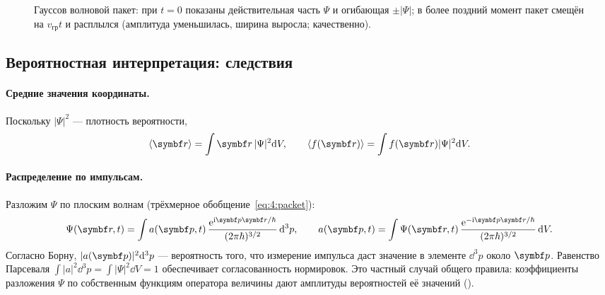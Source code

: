 \begin{figure}[htbp]
\centering
{}
\caption{Гауссов волновой пакет: при $t=0$ показаны действительная часть $\Psi$ и огибающая
$\pm|\Psi|$; в более поздний момент пакет смещён на $v_{\text{гр}}t$ и расплылся
(амплитуда уменьшилась, ширина выросла; качественно).}
\label{fig:4:packet}
\end{figure}

\subsection{Вероятностная интерпретация: следствия}

\paragraph{Средние значения координаты.} Поскольку $|\Psi|^2$ — плотность вероятности,
\begin{equation}
  \avg{\vect r}=\int\vect r\,|\Psi|^2\dd V,\qquad \avg{f(\vect r)}=\int f(\vect r)|\Psi|^2\dd V .
\end{equation}

\paragraph{Распределение по импульсам.} Разложим $\Psi$ по плоским волнам (трёхмерное
обобщение~\eqref{eq:4:packet}):
\begin{equation}\label{eq:4:ap}
  \Psi(\vect r,t)=\int a(\vect p,t)\,\frac{\ee^{\ii\vect p\vect r/\hbar}}{(2\pi\hbar)^{3/2}}\,\dd^3p,
  \qquad
  a(\vect p,t)=\int\Psi(\vect r,t)\,\frac{\ee^{-\ii\vect p\vect r/\hbar}}{(2\pi\hbar)^{3/2}}\,\dd V .
\end{equation}
Согласно Борну, $|a(\vect p)|^2\dd^3p$ — вероятность того, что измерение импульса даст значение
в элементе $\dd^3p$ около $\vect p$. Равенство Парсеваля $\int|a|^2\dd^3p=\int|\Psi|^2\dd V=1$
обеспечивает согласованность нормировок. Это частный случай общего правила: коэффициенты
разложения $\Psi$ по собственным функциям оператора величины дают амплитуды вероятностей её
значений ().

